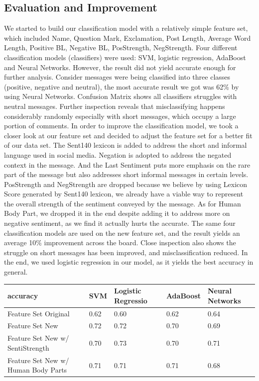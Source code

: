 \documentclass{llncs}
\begin{document}
\subsection{Evaluation and Improvement}
We started to build our classification model with a relatively simple feature set, which included Name, Question Mark, Exclamation, Post Length, Average Word Length, Positive BL, Negative BL, PosStrength, NegStrength. Four different classification models (classifiers) were used: SVM, logistic regression, AdaBoost and Neural Networks\cite{scikit-learn}. However, the result did not yield accurate enough for further analysis. Consider messages were being classified into three classes (positive, negative and neutral), the most accurate result we got was 62\% by using Neural Networks. Confusion Matrix shows all classifiers struggles with neutral messages. Further inspection reveals that misclassifying happens considerably randomly especially with short messages, which occupy a large portion of comments. In order to improve the classification model, we took a closer look at our feature set and decided to adjust the feature set for a better fit of our data set. The Sent140 lexicon is added to address the short and informal language used in social media. Negation is adopted to address the negated context in the message. And the Last Sentiment puts more emphasis on the rare part of the message but also addresses short informal messages in certain levels. PosStrength and NegStrength are dropped because we believe by using Lexicon Score generated by Sent140 lexicon, we already have a viable way to represent the overall strength of the sentiment conveyed by the message. As for Human Body Part, we dropped it in the end despite adding it to address more on negative sentiment,  as we find it actually hurts the accurate.  The same four classification models are used on the new feature set, and the result yields an average 10\% improvement across the board. Close inspection also shows the struggle on short messages has been improved, and misclassification reduced. In the end, we used logistic regression in our model, as it yields the best accuracy in general.

\begin{center}
\begin{tabular}{ m{10em} | m{2cm} | m{2cm} | m{2cm} | m{2cm} }
  \hline
  accuracy & SVM & Logistic Regressio & AdaBoost & Neural Networks\\
  \hline\hline
  Feature Set Original & 0.62 & 0.60 & 0.62 & 0.64\\
  \hline
  Feature Set New & 0.72 & 0.72 & 0.70 & 0.69\\
  \hline
  Feature Set New w/ SentiStrength & 0.70 & 0.73 & 0.70 & 0.71\\
  \hline
  Feature Set New w/ Human Body Parts & 0.71 & 0.71 & 0.71 & 0.68\\
  \hline
\end{tabular}
\end{center}
\end{document}
